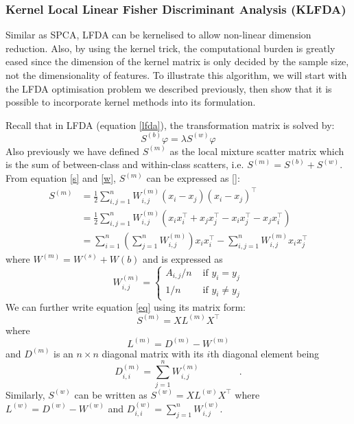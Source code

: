 \documentclass[a4paper,12pt]{article}
\begin{document}
\subsubsection{Kernel Local Linear Fisher Discriminant Analysis (KLFDA)}
Similar as SPCA, LFDA can be kernelised to allow non-linear dimension reduction. Also, by using the kernel trick, the computational burden is greatly eased since the dimension of the kernel matrix is only decided by the sample size, not the dimensionality of features. To illustrate this algorithm, we will start with the LFDA optimisation problem we described previously, then show that it is possible to incorporate kernel methods into its formulation.

Recall that in LFDA (equation \ref{lfda}), the transformation matrix is solved by:
\begin{equation*} 
{S}^{(b)} {\varphi}={\lambda} {S}^{(w)} {\varphi}
\end{equation*}
Also previously we have defined ${S}^{(m)}$ as the local mixture scatter matrix which is the sum of between-class and within-class scatters, i.e. ${S}^{(m)} = {S}^{(b)}+{S}^{(w)}$. From equation \ref{s} and \ref{w}, ${S}^{(m)}$ can be expressed as [\cite{sugiyama2007dimensionality}]:
\begin{align} \label{eq}
{S}^{(m)} &= \frac{1}{2} \sum_{i, j=1}^{n} {W}_{i, j}^{(m)}\left(x_{i}-x_{j}\right)\left(x_{i}-x_{j}\right)^{\top} \\
&=\frac{1}{2} \sum_{i, j=1}^{n} {W}_{i, j}^{(m)}\left(x_{i} x_{i}^{\top}+x_{j} x_{j}^{\top}-x_{i} x_{j}^{\top}-x_{j} x_{i}^{\top}\right) \\
&=\sum_{i=1}^{n}\left(\sum_{j=1}^{n} {W}_{i, j}^{(m)}\right) x_{i} x_{i}^{\top}-\sum_{i, j=1}^{n} {W}_{i, j}^{(m)} x_{i} x_{j}^{\top}
\end{align}
where $W^{(m)} = W^{(s)} + W{(b)}$ and is expressed as
\begin{equation*}
{W}_{i, j}^{(m)} = \left\{\begin{array}{cc}
A_{i, j} / n & \text { if } y_{i}=y_{j} \\
1 / n & \text { if } y_{i} \neq y_{j}
\end{array}\right.
\end{equation*}
We can further write equation \ref{eq} using its matrix form:
\begin{equation*}
{S}^{(m)}=X {L}^{(m)} X^{\top}
\end{equation*}
where 
\begin{equation*}
{L}^{(m)} = {D}^{(m)}-{W}^{(m)}
\end{equation*}
 and $D^{(m)}$ is an $n \times n$ diagonal matrix with its $i$th diagonal element being 
 \begin{equation*}
{D}_{i, i}^{(m)} = \sum_{j=1}^{n} {W}_{i, j}^{(m)} \hspace{50pt} \text{.}
\end{equation*}
Similarly, ${S}^{(w)}$ can be written as ${S}^{(w)}=X {L}^{(w)} X^{\top}$ where ${L}^{(w)} = {D}^{(w)}-{W}^{(w)}$ and ${D}_{i, i}^{(w)} = \sum_{j=1}^{n} {W}_{i, j}^{(w)}$. 
\end{document}
